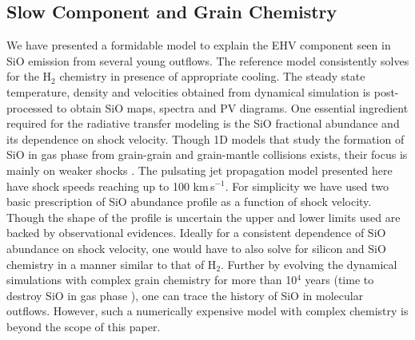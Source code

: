 \documentclass[useAMS,usenatbib]{mn2e}
\begin{document}
\subsection{Slow Component and Grain Chemistry}
%
We have presented a formidable model to explain the EHV component seen
in SiO emission from several young outflows. The reference model
consistently solves for the H$_{2}$ chemistry in presence of
appropriate cooling. The steady state temperature, density and velocities obtained from dynamical
simulation is post-processed to obtain SiO maps, spectra and PV
diagrams. One essential ingredient required for the radiative transfer modeling
is the SiO fractional abundance and its dependence on shock velocity. 
Though 1D models that study the formation of SiO in gas phase from grain-grain and grain-mantle
collisions exists, their focus is mainly on weaker shocks
\citep{Schilke:1997p14140, Caselli:1997p14853, Gusdorf:2008p13800}. 
The pulsating jet propagation model presented here have shock speeds
reaching up to 100 km\,s$^{-1}$. For simplicity we have used two basic
prescription of SiO abundance profile as a function of shock
velocity. Though the shape of the profile is uncertain the upper and
lower limits used are backed by observational evidences. Ideally for a consistent
dependence of SiO abundance on shock velocity, one would have to also
solve for silicon and SiO chemistry in a manner similar to that of
H$_{2}$. Further by evolving the dynamical simulations with complex
grain chemistry for more than 10$^{4}$ years (time to destroy SiO in
gas phase \cite{Codella:1999p12584}),  one can trace the history of 
SiO in molecular outflows. However, such a numerically expensive model 
with complex chemistry is beyond the scope of this paper.  
%
\end{document}

